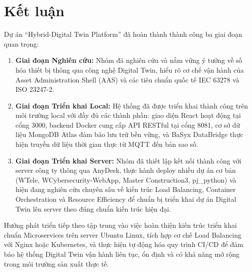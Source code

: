 \documentclass[twocolumn]{article}
\begin{document}
\section{Kết luận}
Dự án ``Hybrid-Digital Twin Platform'' đã hoàn thành thành công ba giai đoạn quan trọng:

\begin{enumerate}
	\item \textbf{Giai đoạn Nghiên cứu:} Nhóm đã nghiên cứu và nắm vững ý tưởng về số hóa thiết bị thông qua công nghệ Digital Twin, hiểu rõ cơ chế vận hành của Asset Administration Shell (AAS) và các tiêu chuẩn quốc tế IEC 63278 và ISO 23247-2.
	
	\item \textbf{Giai đoạn Triển khai Local:} Hệ thống đã được triển khai thành công trên môi trường local với đầy đủ các thành phần: giao diện React hoạt động tại cổng 3000, backend Docker cung cấp API RESTful tại cổng 8081, cơ sở dữ liệu MongoDB Atlas đảm bảo lưu trữ bền vững, và BaSyx DataBridge thực hiện truyền dữ liệu thời gian thực từ MQTT đến bản sao số.
	
	\item \textbf{Giai đoạn Triển khai Server:} Nhóm đã thiết lập kết nối thành công với server công ty thông qua AnyDesk, thực hành deploy nhiều dự án cơ bản (WTele, WCybersecurity-WebApp, Master Construction3, pj\_python) và hiện đang nghiên cứu chuyên sâu về kiến trúc Load Balancing, Container Orchestration và Resource Efficiency để chuẩn bị triển khai dự án Digital Twin lên server theo đúng chuẩn kiến trúc hiện đại.
\end{enumerate}

Hướng phát triển tiếp theo tập trung vào việc hoàn thiện kiến trúc triển khai chuẩn Microservices trên server Ubuntu Linux, tích hợp cơ chế Load Balancing với Nginx hoặc Kubernetes, và thực hiện tự động hóa quy trình CI/CD để đảm bảo hệ thống Digital Twin vận hành liên tục, ổn định và có khả năng mở rộng trong môi trường sản xuất thực tế.

\end{document}
